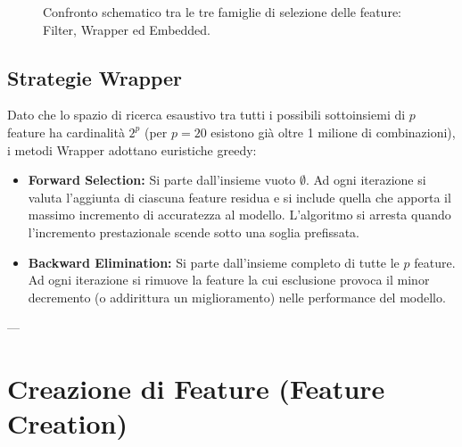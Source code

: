 \begin{figure}[H]
{%
}
\caption{Confronto schematico tra le tre famiglie di selezione delle feature: Filter, Wrapper ed Embedded.}
\label{fig:feature-selection-methods}
\end{figure}

\subsection{Strategie Wrapper}
Dato che lo spazio di ricerca esaustivo tra tutti i possibili sottoinsiemi di $p$ feature ha cardinalità $2^p$ (per $p=20$ esistono già oltre 1 milione di combinazioni), i metodi Wrapper adottano euristiche greedy:
\begin{itemize}
    \item \textbf{Forward Selection:} Si parte dall'insieme vuoto $\emptyset$. Ad ogni iterazione si valuta l'aggiunta di ciascuna feature residua e si include quella che apporta il massimo incremento di accuratezza al modello. L'algoritmo si arresta quando l'incremento prestazionale scende sotto una soglia prefissata.
    \item \textbf{Backward Elimination:} Si parte dall'insieme completo di tutte le $p$ feature. Ad ogni iterazione si rimuove la feature la cui esclusione provoca il minor decremento (o addirittura un miglioramento) nelle performance del modello.
\end{itemize}

---

\section{Creazione di Feature (Feature Creation)}

